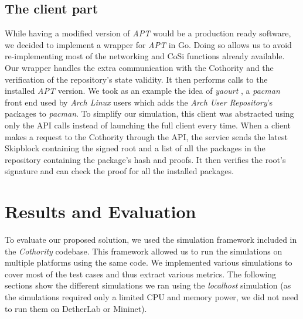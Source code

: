 \documentclass[11pt, upma4paper, twoside, openany, parskip=half]{book}
\begin{document}
\section{The client part}
While having a modified version of \emph{APT} would be a production ready software, we decided to implement a wrapper for \emph{APT} in Go. Doing so allows us to avoid re-implementing most of the networking and CoSi functions already available. Our wrapper handles the extra communication with the Cothority and the verification of the repository's state validity. It then performs calls to the installed \emph{APT} version. We took as an example the idea of \emph{yaourt} \cite{_piec/yaourt_????}, a \emph{pacman} \cite{_pacman_????} front end used by \emph{Arch Linux} users which adds the \emph{Arch User Repository}'s packages to \emph{pacman}. To simplify our simulation, this client was abstracted using only the API calls instead of launching the full client every time. When a client makes a request to the Cothority through the API, the service sends the latest Skipblock containing the signed root and a list of all the packages in the repository containing the package's hash and proofs. It then verifies the root's signature and can check the proof for all the installed packages.

\chapter{Results and Evaluation}
To evaluate our proposed solution, we used the simulation framework included in the \emph{Cothority} codebase. This framework allowed us to run the simulations on multiple platforms using the same code. We implemented various simulations to cover most of the test cases and thus extract various metrics. The following sections show the different simulations we ran using the \emph{localhost} simulation (as the simulations required only a limited CPU and memory power, we did not need to run them on DetherLab or Mininet).
\end{document}
